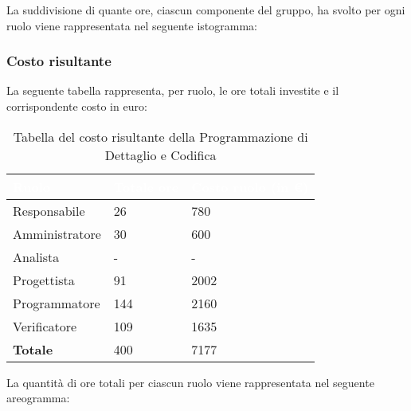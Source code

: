 La suddivisione di quante ore, ciascun componente del gruppo, ha svolto per ogni ruolo viene rappresentata nel seguente istogramma:
\begin{center}
	\pgfplotsset{width=17cm, height=8.5cm}
\end{center}
\clearpage

\subsubsection{Costo risultante}
La seguente tabella rappresenta, per ruolo, le ore totali investite e il corrispondente costo in euro:
{
\renewcommand{\arraystretch}{2}
\begin{longtable}{ C{3cm} C{2cm} C{4cm}}
\caption{Tabella del costo risultante della Programmazione di Dettaglio e Codifica}\\

\textcolor{white}{\textbf{Ruolo}} & 
\textcolor{white}{\textbf{Totale ore}} & 
\textcolor{white}{\textbf{Costo ruolo (in \euro{})}}\\	
\endhead
        
Responsabile    &  26 &  780 \\
Amministratore  &  30 &  600 \\
Analista        &   - &    - \\
Progettista     &  91 & 2002 \\
Programmatore   & 144 & 2160 \\
Verificatore    & 109 & 1635 \\
\textbf{Totale} & 400 & 7177 \\
		
\end{longtable}
}

La quantità di ore totali per ciascun ruolo viene rappresentata nel seguente areogramma:
\begin{center}
\end{center}